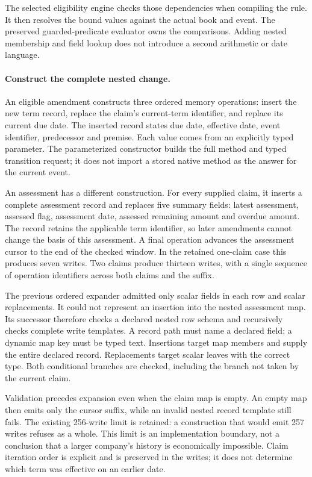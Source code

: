 The selected eligibility engine checks those dependencies when compiling the
rule. It then resolves the bound values against the actual book and event.
The preserved guarded-predicate evaluator owns the comparisons. Adding nested
membership and field lookup does not introduce a second arithmetic or date
language.

\paragraph{Construct the complete nested change.}
An eligible amendment constructs three ordered memory operations: insert the
new term record, replace the claim's current-term identifier, and replace its
current due date. The inserted record states due date, effective date, event
identifier, predecessor and premise. Each value comes from an explicitly typed
parameter. The parameterized constructor builds the full method and typed
transition request; it does not import a stored native method as the answer
for the current event.

An assessment has a different construction. For every supplied claim, it
inserts a complete assessment record and replaces five summary fields:
latest assessment, assessed flag, assessment date, assessed remaining amount
and overdue amount. The record retains the applicable term identifier, so
later amendments cannot change the basis of this assessment. A final operation
advances the assessment cursor to the end of the checked window. In the
retained one-claim case this produces seven writes. Two claims produce thirteen
writes, with a single sequence of operation identifiers across both claims and
the suffix.

The previous ordered expander admitted only scalar fields in each row and
scalar replacements. It could not represent an insertion into the nested
assessment map. Its successor therefore checks a declared nested row schema
and recursively checks complete write templates. A record path must name a
declared field; a dynamic map key must be typed text. Insertions target map
members and supply the entire declared record. Replacements target scalar
leaves with the correct type. Both conditional branches are checked, including
the branch not taken by the current claim.

Validation precedes expansion even when the claim map is empty. An empty map
then emits only the cursor suffix, while an invalid nested record template
still fails. The existing 256-write limit is retained: a construction that
would emit 257 writes refuses as a whole. This limit is an implementation
boundary, not a conclusion that a larger company's history is economically
impossible. Claim iteration order is explicit and is preserved in the writes;
it does not determine which term was effective on an earlier date.

